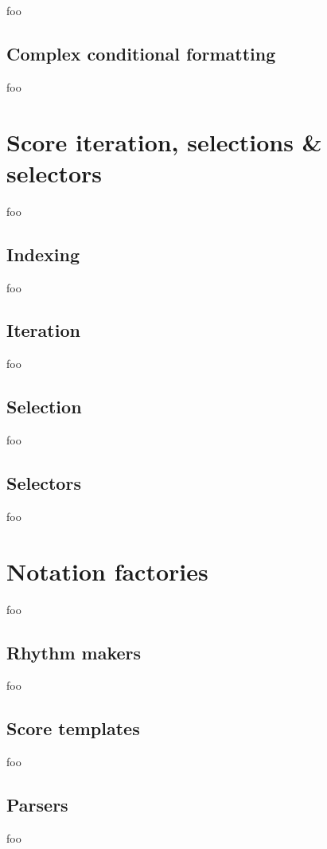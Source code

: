 foo

\subsection{Complex conditional formatting}

foo

\section{Score iteration, selections \& selectors}

foo

\subsection{Indexing}

foo

\subsection{Iteration}

foo

\subsection{Selection}

foo

\subsection{Selectors}

foo

\section{Notation factories}

foo

\subsection{Rhythm makers}

foo

\subsection{Score templates}

foo

\subsection{Parsers}

foo